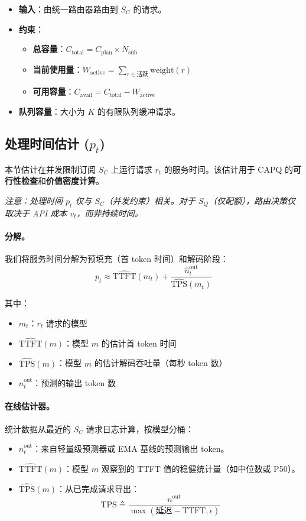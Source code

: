 \documentclass[11pt]{article}
\begin{document}
\begin{itemize}
  \item \textbf{输入}：由统一路由器路由到 $S_C$ 的请求。
  \item \textbf{约束}：
    \begin{itemize}
      \item \textbf{总容量}：$C_{\text{total}} = C_{\text{plan}} \times N_{\text{sub}}$
      \item \textbf{当前使用量}：$W_{\text{active}} = \sum_{r \in \text{活跃}} \text{weight}(r)$
      \item \textbf{可用容量}：$C_{\text{avail}} = C_{\text{total}} - W_{\text{active}}$
    \end{itemize}
  \item \textbf{队列容量}：大小为 $K$ 的有限队列缓冲请求。
\end{itemize}

\subsection{处理时间估计 ($p_t$)}

本节估计在并发限制订阅 $S_C$ 上运行请求 $r_t$ 的服务时间。该估计用于 CAPQ 的\textbf{可行性检查}和\textbf{价值密度计算}。

\emph{注意：处理时间 $p_t$ 仅与 $S_C$（并发约束）相关。对于 $S_Q$（仅配额），路由决策仅取决于 API 成本 $v_t$，而非持续时间。}

\paragraph{分解。}
我们将服务时间分解为预填充（首 token 时间）和解码阶段：
\[ p_t \approx \widehat{\text{TTFT}}(m_t) + \frac{\hat{n}^{\text{out}}_t}{\widehat{\text{TPS}}(m_t)} \]

其中：
\begin{itemize}
  \item $m_t$：$r_t$ 请求的模型
  \item $\widehat{\text{TTFT}}(m)$：模型 $m$ 的估计首 token 时间
  \item $\widehat{\text{TPS}}(m)$：模型 $m$ 的估计解码吞吐量（每秒 token 数）
  \item $\hat{n}^{\text{out}}_t$：预测的输出 token 数
\end{itemize}

\paragraph{在线估计器。}
统计数据从最近的 $S_C$ 请求日志计算，按模型分桶：
\begin{itemize}
  \item $\hat{n}^{\text{out}}_t$：来自轻量级预测器或 EMA 基线的预测输出 token。
  \item $\widehat{\text{TTFT}}(m)$：模型 $m$ 观察到的 TTFT 值的稳健统计量（如中位数或 P50）。
  \item $\widehat{\text{TPS}}(m)$：从已完成请求导出：
  \[ \text{TPS} \triangleq \frac{n^{\text{out}}}{\max(\text{延迟} - \text{TTFT}, \epsilon)} \]
\end{itemize}
\end{document}
